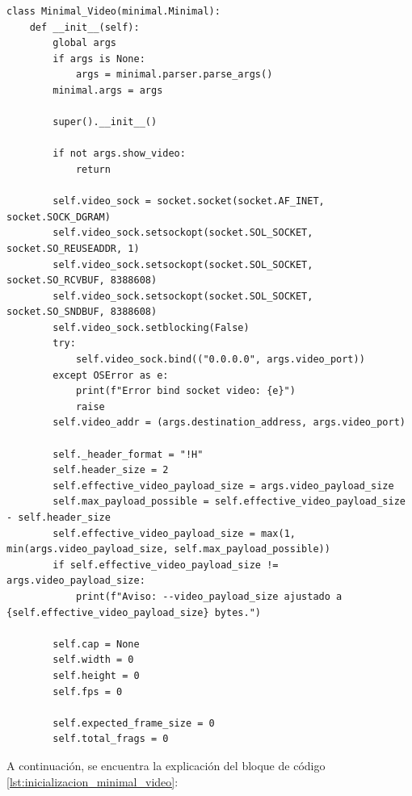 \begin{lstlisting}[style=pythonstyle, caption={Comienzo de la clase \textit{Minimal\_Video} y parte de la inicialización}, label={lst:inicializacion_minimal_video}]
class Minimal_Video(minimal.Minimal):
    def __init__(self):
        global args
        if args is None:
            args = minimal.parser.parse_args()
        minimal.args = args

        super().__init__()

        if not args.show_video:
            return

        self.video_sock = socket.socket(socket.AF_INET, socket.SOCK_DGRAM)
        self.video_sock.setsockopt(socket.SOL_SOCKET, socket.SO_REUSEADDR, 1)
        self.video_sock.setsockopt(socket.SOL_SOCKET, socket.SO_RCVBUF, 8388608)
        self.video_sock.setsockopt(socket.SOL_SOCKET, socket.SO_SNDBUF, 8388608)
        self.video_sock.setblocking(False)
        try:
            self.video_sock.bind(("0.0.0.0", args.video_port))
        except OSError as e:
            print(f"Error bind socket video: {e}")
            raise
        self.video_addr = (args.destination_address, args.video_port)

        self._header_format = "!H"
        self.header_size = 2
        self.effective_video_payload_size = args.video_payload_size
        self.max_payload_possible = self.effective_video_payload_size - self.header_size
        self.effective_video_payload_size = max(1, min(args.video_payload_size, self.max_payload_possible))
        if self.effective_video_payload_size != args.video_payload_size:
            print(f"Aviso: --video_payload_size ajustado a {self.effective_video_payload_size} bytes.")

        self.cap = None
        self.width = 0
        self.height = 0
        self.fps = 0

        self.expected_frame_size = 0
        self.total_frags = 0
\end{lstlisting}

A continuación, se encuentra la explicación del bloque de código \ref{lst:inicializacion_minimal_video}:

